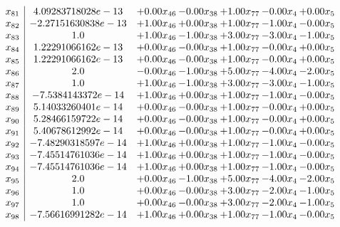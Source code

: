 \documentclass[8pt]{article}
\begin{document}
\[\begin{array}{c| c c@{\hskip 2pt} c@{\hskip 2pt} c@{\hskip 2pt} c@{\hskip 2pt} c@{\hskip 2pt} }
 x_{81}   &  4.09283718028e-13 & +  0.00 x_{46} & -0.00 x_{38} & +  1.00 x_{77} & -0.00 x_{4} & +  0.00 x_{5}\\
 x_{82}   &  -2.27151630838e-13 & +  1.00 x_{46} & +  0.00 x_{38} & +  1.00 x_{77} & -1.00 x_{4} & -0.00 x_{5}\\
 x_{83}   &  1.0 & +  1.00 x_{46} & -1.00 x_{38} & +  3.00 x_{77} & -3.00 x_{4} & -1.00 x_{5}\\
 x_{84}   &  1.22291066162e-13 & +  0.00 x_{46} & -0.00 x_{38} & +  1.00 x_{77} & -0.00 x_{4} & +  0.00 x_{5}\\
 x_{85}   &  1.22291066162e-13 & +  0.00 x_{46} & -0.00 x_{38} & +  1.00 x_{77} & -0.00 x_{4} & +  0.00 x_{5}\\
 x_{86}   &  2.0 & -0.00 x_{46} & -1.00 x_{38} & +  5.00 x_{77} & -4.00 x_{4} & -2.00 x_{5}\\
 x_{87}   &  1.0 & +  1.00 x_{46} & -1.00 x_{38} & +  3.00 x_{77} & -3.00 x_{4} & -1.00 x_{5}\\
 x_{88}   &  -7.5384143372e-14 & +  1.00 x_{46} & +  0.00 x_{38} & +  1.00 x_{77} & -1.00 x_{4} & -0.00 x_{5}\\
 x_{89}   &  5.14033260401e-14 & +  0.00 x_{46} & -0.00 x_{38} & +  1.00 x_{77} & -0.00 x_{4} & +  0.00 x_{5}\\
 x_{90}   &  5.28466159722e-14 & +  0.00 x_{46} & -0.00 x_{38} & +  1.00 x_{77} & -0.00 x_{4} & +  0.00 x_{5}\\
 x_{91}   &  5.40678612992e-14 & +  0.00 x_{46} & -0.00 x_{38} & +  1.00 x_{77} & -0.00 x_{4} & +  0.00 x_{5}\\
 x_{92}   &  -7.48290318597e-14 & +  1.00 x_{46} & +  0.00 x_{38} & +  1.00 x_{77} & -1.00 x_{4} & -0.00 x_{5}\\
 x_{93}   &  -7.45514761036e-14 & +  1.00 x_{46} & +  0.00 x_{38} & +  1.00 x_{77} & -1.00 x_{4} & -0.00 x_{5}\\
 x_{94}   &  -7.45514761036e-14 & +  1.00 x_{46} & +  0.00 x_{38} & +  1.00 x_{77} & -1.00 x_{4} & -0.00 x_{5}\\
 x_{95}   &  2.0 & +  0.00 x_{46} & -1.00 x_{38} & +  5.00 x_{77} & -4.00 x_{4} & -2.00 x_{5}\\
 x_{96}   &  1.0 & +  0.00 x_{46} & -0.00 x_{38} & +  3.00 x_{77} & -2.00 x_{4} & -1.00 x_{5}\\
 x_{97}   &  1.0 & +  0.00 x_{46} & -0.00 x_{38} & +  3.00 x_{77} & -2.00 x_{4} & -1.00 x_{5}\\
 x_{98}   &  -7.56616991282e-14 & +  1.00 x_{46} & +  0.00 x_{38} & +  1.00 x_{77} & -1.00 x_{4} & -0.00 x_{5}\\

\end{array}\]
\end{document}
